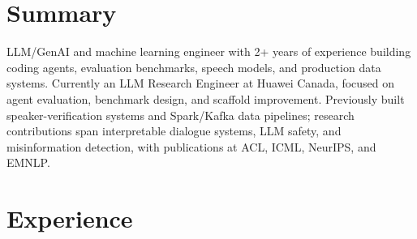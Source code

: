 \documentclass[11pt,letterpaper]{article}
\begin{document}
\datefooter


\section*{Summary}
LLM/GenAI and machine learning engineer with 2+ years of experience building coding agents, evaluation benchmarks, speech models, and production data systems. Currently an LLM Research Engineer at Huawei Canada, focused on agent evaluation, benchmark design, and scaffold improvement. Previously built speaker-verification systems and Spark/Kafka data pipelines; research contributions span interpretable dialogue systems, LLM safety, and misinformation detection, with publications at ACL, ICML, NeurIPS, and EMNLP.

\section*{Experience}
\end{document}
